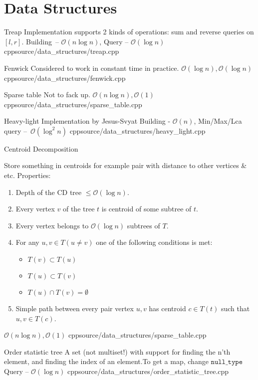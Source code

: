 \documentclass[landscape, 10pt, a4paper, oneside, twocolumn]{extarticle}
\begin{document}
\section{Data Structures}

\Algorithm
{Treap}
{Implementation supports 2 kinds of operations: sum and reverse queries on $[l, r]$.}
{Building – $\mathcal{O}(n \log n)$, Query – $\mathcal{O}(\log n)$}
{cpp}{source/data_structures/treap.cpp}

\Algorithm
{Fenwick}
{Considered to work in constant time in practice.}
{$\mathcal{O}(\log n), \mathcal{O}(\log n)$}
{cpp}{source/data_structures/fenwick.cpp}

\Algorithm
{Sparse table}
{Not to fack up.}
{$\mathcal{O}(n \log n), \mathcal{O}(1)$}
{cpp}{source/data_structures/sparse_table.cpp}

\Algorithm
{Heavy-light}
{Implementation by Jesus-Svyat}
{Building - $\mathcal{O}(n)$, Min/Max/Lca query – $\mathcal{O}(\log^2 n)$}
{cpp}{source/data_structures/heavy_light.cpp}

\Algorithm
{Centroid Decomposition}
{Store something in centroids for example pair with distance to other vertices & etc.
Properties:
    \begin{enumerate}
        \item Depth of the CD tree $ \leq \mathcal{O}(\log n)$.
        \item Every vertex $v$ of the tree $t$ is centroid of some subtree of $t$.
        \item Every vertex belongs to $\mathcal{O}(\log n)$ subtrees of $T$.
        \item For any $u, v \in T (u \neq v)$ one of the following conditions is met:
            \begin{itemize}
                \item $T(v) \subset T(u)$
                \item $T(u) \subset T(v)$
                \item $T(u) \cap T(v) = \emptyset $
            \end{itemize}
        \item Simple path between every pair vertex $u, v$ has centroid $c \in T(t)$ such that $u, v \in T(c)$. 
    \end{enumerate}
}
{$\mathcal{O}(n \log n), \mathcal{O}(1)$}
{cpp}{source/data_structures/sparse_table.cpp}

\Algorithm
{Order statistic tree}
{A set (not multiset!) with support for finding the n'th element, and finding the index of an element.To get a map, change $\texttt{null\_type}$}
{Query – $\mathcal{O}(\log n)$}
{cpp}{source/data_structures/order_statistic_tree.cpp}
\end{document}
